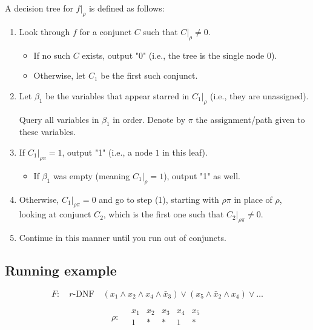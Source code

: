 A decision tree for \( f|_{\rho} \) is defined as follows:

\begin{enumerate}
    \item Look through \( f \) for a conjunct \( C \) such that \( C|_{\rho} \neq 0 \).
    \begin{itemize}
        \item If no such \( C \) exists, output "0" (i.e., the tree is the single node \( 0 \)).
        \item Otherwise, let \( C_1 \) be the first such conjunct.
    \end{itemize}
    
    \item Let \( \beta_1 \) be the variables that appear starred in \( C_1|_{\rho} \) (i.e., they are unassigned).
    
    Query all variables in \( \beta_1 \) in order. Denote by \( \pi \) the assignment/path given to these variables.
    
    \item If \( C_1|_{\rho\pi} = 1 \), output "1" (i.e., a node \( 1 \) in this leaf).
    \begin{itemize}
        \item If \( \beta_1 \) was empty (meaning \( C_1|_{\rho} = 1 \)), output "1" as well.
    \end{itemize}
    
    \item Otherwise, \( C_1|_{\rho\pi} = 0 \) and go to step (1), starting with \( \rho\pi \) in place of \( \rho \), looking at conjunct \( C_2 \), which is the first one such that \( C_2|_{\rho\pi} \neq 0 \).
    
    \item Continue in this manner until you run out of conjuncts.
\end{enumerate}

\subsection*{Running example}

\[
F: \quad r\text{-DNF} \quad (x_1 \land x_2 \land x_4 \land \bar{x}_3) \lor (x_5 \land \bar{x}_2 \land x_4) \lor \dots
\]

\[
\rho: \quad 
\begin{array}{ccccc}
x_1 & x_2 & x_3 & x_4 & x_5 \\
1 & * & * & 1 & *
\end{array}
\]

